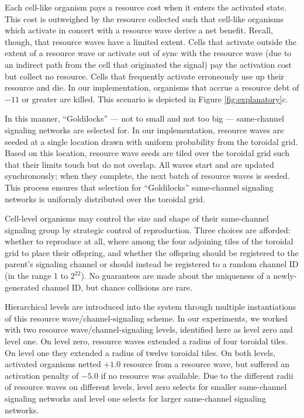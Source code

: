 Each cell-like organism pays a resource cost when it enters the activated state.
This cost is outweighed by the resource collected such that cell-like organisms which activate in concert with a resource wave derive a net benefit.
Recall, though, that resource waves have a limited extent.
Cells that activate outside the extent of a resource wave or activate out of sync with the resource wave (due to an indirect path from the cell that originated the signal) pay the activation cost but collect no resource.
Cells that frequently activate erroneously use up their resource and die.
In our implementation, organisms that accrue a resource debt of $-11$ or greater are killed.
This scenario is depicted in Figure \ref{fig:explanatory}$c$.

In this manner, ``Goldilocks'' --- not to small and not too big --- same-channel signaling networks are selected for.
In our implementation, resource waves are seeded at a single location drawn  with uniform probability from the toroidal grid.
Based on this location, resource wave seeds are tiled over the toroidal grid such that their limits touch but do not overlap.
All waves start and are updated synchronously;
when they complete, the next batch of resource waves is seeded.
This process ensures that selection for ``Goldilocks'' same-channel signaling networks is uniformly distributed over the toroidal grid.

Cell-level organisms may control the size and shape of their same-channel signaling group by strategic control of reproduction.
Three choices are afforded: whether to reproduce at all, where among the four adjoining tiles of the toroidal grid to place their offspring, and whether the offspring should be registered to the parent's signaling channel or should instead be registered to a random channel ID (in the range 1 to $2^{22}$).
No guarantees are made about the uniqueness of a newly-generated channel ID, but chance collisions are rare.

Hierarchical levels are introduced into the system through multiple instantiations of this resource wave/channel-signaling scheme.
In our experiments, we worked with two resource wave/channel-signaling levels, identified here as level zero and level one.
On level zero, resource waves extended a radius of four toroidal tiles.
On level one they extended a radius of twelve toroidal tiles.
On both levels, activated organisms netted $+1.0$ resource from a resource wave, but suffered an activation penalty of $-5.0$ if no resource was available.
Due to the different radii of resource waves on different levels, level zero selects for smaller same-channel signaling networks and level one selects for larger same-channel signaling networks.

